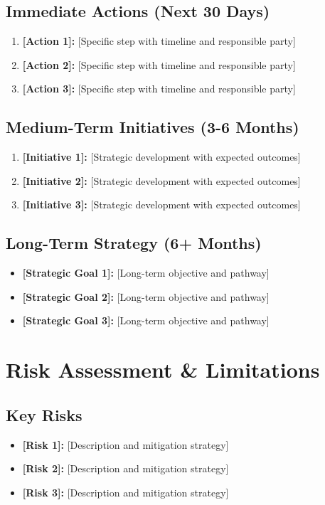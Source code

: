 \documentclass[11pt,letterpaper]{article}
\begin{document}
\subsection{Immediate Actions (Next 30 Days)}
\begin{enumerate}
    \item \textbf{[Action 1]:} [Specific step with timeline and responsible party]
    \item \textbf{[Action 2]:} [Specific step with timeline and responsible party]
    \item \textbf{[Action 3]:} [Specific step with timeline and responsible party]
\end{enumerate}

\subsection{Medium-Term Initiatives (3-6 Months)}
\begin{enumerate}
    \item \textbf{[Initiative 1]:} [Strategic development with expected outcomes]
    \item \textbf{[Initiative 2]:} [Strategic development with expected outcomes]
    \item \textbf{[Initiative 3]:} [Strategic development with expected outcomes]
\end{enumerate}

\subsection{Long-Term Strategy (6+ Months)}
\begin{itemize}
    \item \textbf{[Strategic Goal 1]:} [Long-term objective and pathway]
    \item \textbf{[Strategic Goal 2]:} [Long-term objective and pathway]
    \item \textbf{[Strategic Goal 3]:} [Long-term objective and pathway]
\end{itemize}

\section{Risk Assessment \& Limitations}

\subsection{Key Risks}
\begin{itemize}
    \item \textbf{[Risk 1]:} [Description and mitigation strategy]
    \item \textbf{[Risk 2]:} [Description and mitigation strategy]
    \item \textbf{[Risk 3]:} [Description and mitigation strategy]
\end{itemize}
\end{document}
